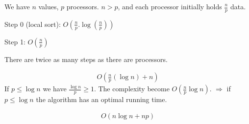 We have $n$ values, $p$ processors. $n>p$, and each processor initially holds $\frac{n}{p}$ data.


Step 0 (local sort): $O(\frac{n}{p}. \log(\frac{n}{p}))$

Step 1: $O(\frac{n}{p})$

There are twice as many steps as there are processors.

\begin{align*}
O(\frac{n}{p}(\log n) +n )
\end{align*}
If $p\leq \log n$ we have $\frac{\log n}{p}\geq 1$. The complexity become $O(\frac{n}{p}\log n)$.
$\Rightarrow$ if $p\leq \log n$ the algorithm has an optimal running time.

\begin{align*}
O(n\log n + np)
\end{align*}